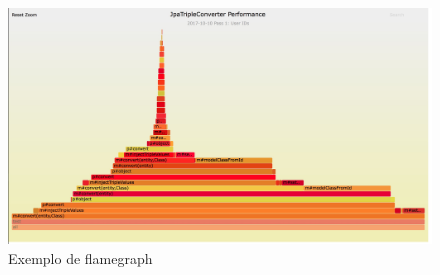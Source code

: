 \begin{description}
	\begin{figure}[htb]
		\caption{\label{fig:flamegraph-example}Exemplo de flamegraph}
		\begin{center}
		\includegraphics[width=\textwidth,keepaspectratio]{pictures/flame-graph-example.jpg}
		\end{center}
	\end{figure}
\end{description}
